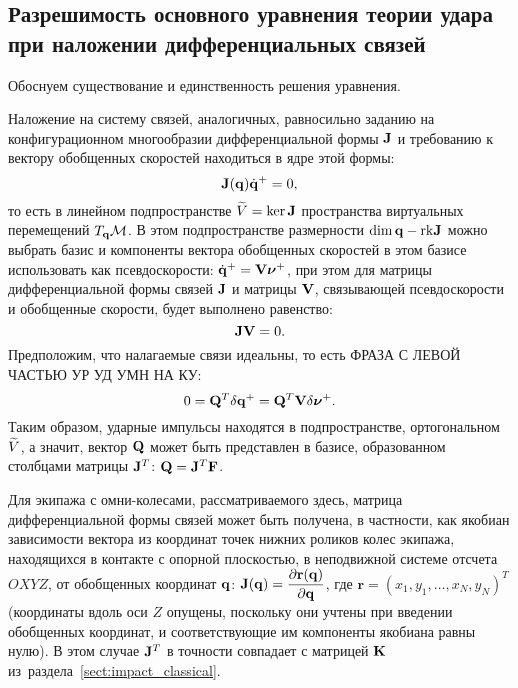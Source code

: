 
\subsection{Разрешимость основного уравнения теории удара при наложении дифференциальных связей}

Обоснуем существование и единственность решения уравнения.

Наложение на систему связей, аналогичных, равносильно заданию на конфигурационном многообразии дифференциальной формы $\mathbf{J}$ и требованию к вектору обобщенных скоростей находиться в ядре этой формы:
\begin{equation}\label{eq:constraints_form}
    \mathbf{J}(\mathbf{q})\dot{\mathbf{q}}^+ = 0,
\end{equation}
то есть в линейном подпространстве $\widetilde{V} = \ker \mathbf{J}$ пространства виртуальных перемещений $T_{\mathbf{q}}\mathcal{M}$. В этом подпространстве размерности $\dim \mathbf{q} - \mathrm{rk} \mathbf{J}$ можно выбрать базис и компоненты вектора обобщенных скоростей в этом базисе использовать как псевдоскорости: $\dot{\mathbf{q}}^+ = \mathbf{V}\boldsymbol{\mathbf{\nu}}^+$, при этом для матрицы дифференциальной формы связей $\mathbf{J}$ и матрицы $\mathbf{V}$, связывающей псевдоскорости и обобщенные скорости, будет выполнено равенство:
\begin{equation}\label{eq:constraints_orth}
    \mathbf{J}\mathbf{V} = 0.    
\end{equation}
Предположим, что налагаемые связи идеальны, то есть ФРАЗА С ЛЕВОЙ ЧАСТЬЮ УР УД УМН НА КУ:
\begin{equation}\label{eq:constraints_ideal}
    0 = \mathbf{Q}^T \delta\mathbf{q}^+ = \mathbf{Q}^T \mathbf{V}\delta\boldsymbol{\mathbf{\nu}}^+.
\end{equation}
Таким образом, ударные импульсы находятся в подпространстве, ортогональном $\widetilde{V}$, а значит, вектор $\mathbf{Q}$ может быть представлен в базисе, образованном столбцами матрицы $\mathbf{J}^T$: $\mathbf{Q} = \mathbf{J}^T\mathbf{F}$.

Для экипажа с омни-колесами, рассматриваемого здесь, матрица дифференциальной формы связей может быть получена, в частности, как якобиан зависимости вектора из координат точек нижних роликов колес экипажа, находящихся в контакте с опорной плоскостью, в неподвижной системе отсчета $OXYZ$, от обобщенных координат $\mathbf{q}$: $\mathbf{J}(\mathbf{q}) = \displaystyle\frac{\displaystyle \partial \mathbf{r}(\mathbf{q})}{\displaystyle \partial \mathbf{q}}$, где $\mathbf{r} = ( x_1, y_1, \ldots, x_N, y_N )^T$ (координаты вдоль оси $Z$ опущены, поскольку они учтены при введении обобщенных координат, и соответствующие им компоненты якобиана равны нулю). В этом случае $\mathbf{J}^T$ в точности совпадает с матрицей $\mathbf{K}$ из~раздела~\ref{sect:impact_classical}.

